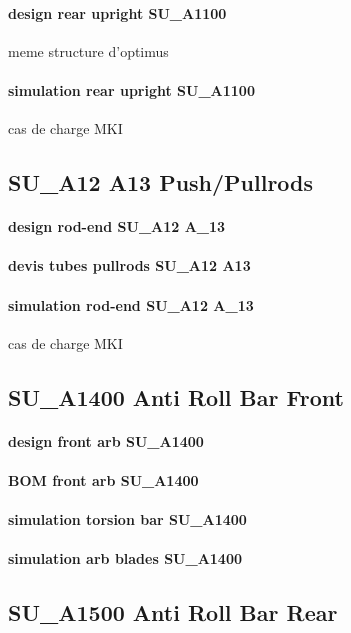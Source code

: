 		\paragraph{design rear upright SU\_A1100} meme structure d'optimus

		\paragraph{simulation rear upright SU\_A1100} cas de charge MKI
	\subsection*{SU\_A12 A13 Push/Pullrods} 
 \par 
		\paragraph{design rod-end SU\_A12 A\_13} 
		\paragraph{devis tubes pullrods SU\_A12 A13} 
		\paragraph{simulation rod-end SU\_A12 A\_13} cas de charge MKI
	\subsection*{SU\_A1400 Anti Roll Bar Front} 
 \par 
		\paragraph{design front arb SU\_A1400} 
		\paragraph{BOM front arb SU\_A1400} 
		\paragraph{simulation torsion bar SU\_A1400} 
		\paragraph{simulation arb blades SU\_A1400} 
	\subsection*{SU\_A1500 Anti Roll Bar Rear} 
 \par 
